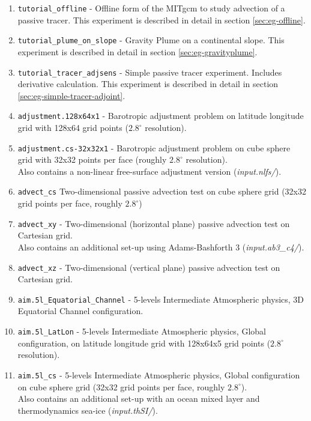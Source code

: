 \begin{enumerate}
\item \texttt{tutorial\_offline} - Offline form of the MITgcm to study
  advection of a passive tracer.  This experiment is described in
  detail in section \ref{sec:eg-offline}.

\item \texttt{tutorial\_plume\_on\_slope} - Gravity Plume on a
  continental slope.  This experiment is described in detail in
  section \ref{sec:eg-gravityplume}.

\item \texttt{tutorial\_tracer\_adjsens} - Simple passive tracer
  experiment. Includes derivative calculation. This experiment is
  described in detail in section \ref{sec:eg-simple-tracer-adjoint}.

\item \texttt{adjustment.128x64x1} - Barotropic adjustment problem on
  latitude longitude grid with 128x64 grid points ($2.8^\circ$ resolution).
  
\item \texttt{adjustment.cs-32x32x1} - Barotropic adjustment problem on
  cube sphere grid with 32x32 points per face (roughly $2.8^\circ$
  resolution).\\
  Also contains a non-linear free-surface adjustment version ({\it input.nlfs/}).
  
\item \texttt{advect\_cs} Two-dimensional passive advection test on
  cube sphere grid (32x32 grid points per face, roughly $2.8^\circ$)
  
\item \texttt{advect\_xy} - Two-dimensional (horizontal plane) passive
  advection test on Cartesian grid.\\
  Also contains an additional set-up using Adams-Bashforth 3 ({\it input.ab3\_c4/}).
  
\item \texttt{advect\_xz} - Two-dimensional (vertical plane) passive
  advection test on Cartesian grid.
  
\item \texttt{aim.5l\_Equatorial\_Channel}
  - 5-levels Intermediate Atmospheric physics, 
  3D Equatorial Channel configuration.
  
\item \texttt{aim.5l\_LatLon} - 5-levels Intermediate Atmospheric physics,
  Global configuration, on latitude longitude grid with 128x64x5 grid
  points ($2.8^\circ$ resolution).
  
\item \texttt{aim.5l\_cs} - 5-levels Intermediate Atmospheric physics,
  Global configuration on cube sphere grid 
  (32x32 grid points per face, roughly $2.8^\circ$).\\
  Also contains an additional set-up with an ocean mixed layer and thermodynamics
  sea-ice ({\it input.thSI/}).


\end{enumerate}
